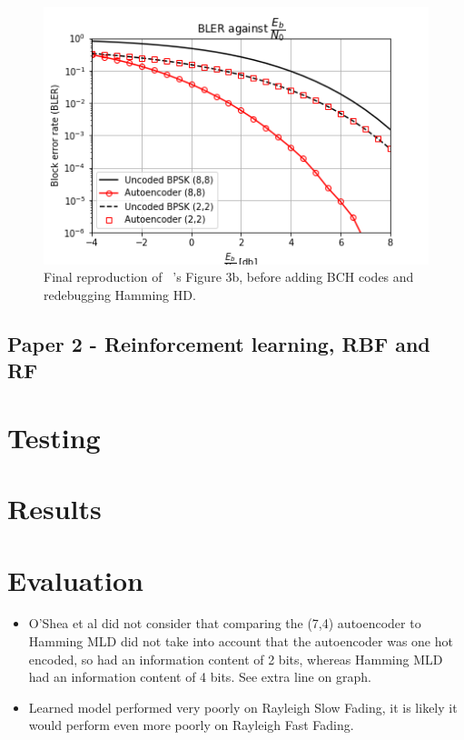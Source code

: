 \documentclass[12pt,onecolumn,letterpaper]{article}
\begin{document}
\begin{figure}[t]
   \begin{center}
      \includegraphics[width=0.8\linewidth]{figures/o_shea_3b_bler_vs_eb.png}
   \end{center}
      \caption{Final reproduction of ~\cite{oShea}'s Figure 3b, before adding BCH codes and redebugging Hamming HD.}
   \label{fig:OSheaFigure3b}
\end{figure}


\subsection{Paper 2 - Reinforcement learning, RBF and RF}

\FloatBarrier
\section{Testing}

\FloatBarrier
\section{Results}

\FloatBarrier
\section{Evaluation}

\begin{itemize}
   \item O'Shea et al did not consider that comparing the (7,4) autoencoder to Hamming MLD did not take into account that the autoencoder was one hot encoded, so had an information content of 2 bits, whereas Hamming MLD had an information content of 4 bits. See extra line on graph.
   \item Learned model performed very poorly on Rayleigh Slow Fading, it is likely it would perform even more poorly on Rayleigh Fast Fading.
\end{itemize}
\end{document}
